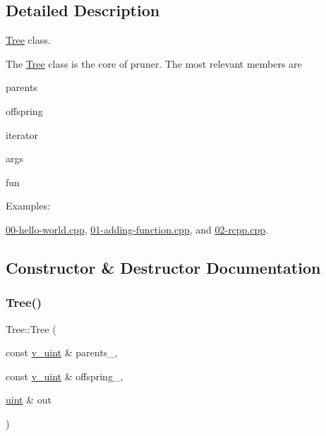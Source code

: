 \subsection{Detailed Description}
\hyperlink{classpruner_1_1Tree}{Tree} class. 

The \hyperlink{classpruner_1_1Tree}{Tree} class is the core of pruner. The most relevant members are
\begin{DoxyItemize}
\item {\ttfamily parents}
\item {\ttfamily offspring}
\item {\ttfamily iterator}
\item {\ttfamily args}
\item {\ttfamily fun} 
\end{DoxyItemize}\begin{Desc}
\item[Examples\+: ]\par
\hyperlink{00-hello-world_8cpp-example}{00-\/hello-\/world.\+cpp}, \hyperlink{01-adding-function_8cpp-example}{01-\/adding-\/function.\+cpp}, and \hyperlink{02-rcpp_8cpp-example}{02-\/rcpp.\+cpp}.\end{Desc}


\subsection{Constructor \& Destructor Documentation}
\mbox{\label{classpruner_1_1Tree_a0f964d9ba9834822d3e18946a5361839}} 
\subsubsection{\texorpdfstring{Tree()}{Tree()}}
{\footnotesize\ttfamily Tree\+::\+Tree (\begin{DoxyParamCaption}\item[{const \hyperlink{namespacepruner_af0145646bd7ede012cd336b416bc5579}{v\+\_\+uint} \&}]{parents\+\_\+,  }\item[{const \hyperlink{namespacepruner_af0145646bd7ede012cd336b416bc5579}{v\+\_\+uint} \&}]{offspring\+\_\+,  }\item[{\hyperlink{namespacepruner_a659e6e64a9e2b8e981c3d34262a2f67e}{uint} \&}]{out }\end{DoxyParamCaption})\hspace{0.3cm}{\ttfamily [inline]}}



